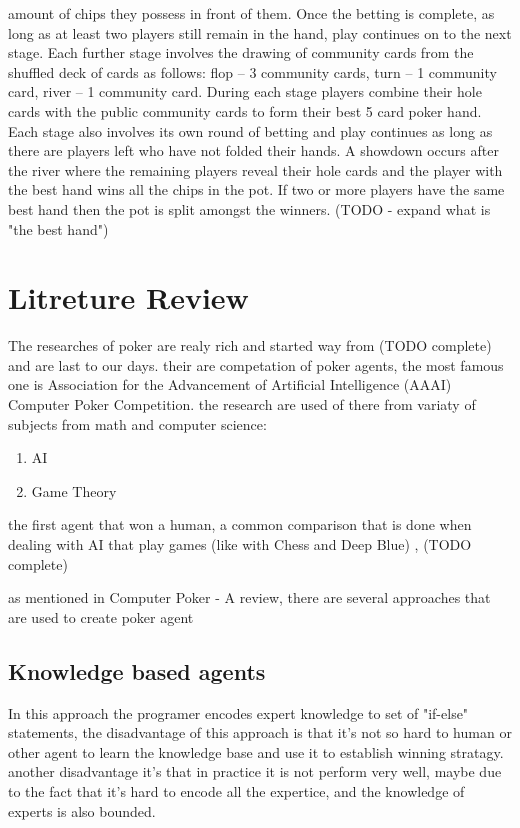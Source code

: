 \documentclass{article}
\begin{document}
amount of chips they possess in front of them. Once the betting is complete, as long as at least two players still remain
in the hand, play continues on to the next stage. Each further stage involves the drawing of community cards from the
shuffled deck of cards as follows: flop – 3 community cards, turn – 1 community card, river – 1 community card.
During each stage players combine their hole cards with the public community cards to form their best 5 card poker
hand. Each stage also involves its own round of betting and play continues as long as there are players left who have not
folded their hands. A showdown occurs after the river where the remaining players reveal their hole cards and the player
with the best hand wins all the chips in the pot. If two or more players have the same best hand then the pot is split
amongst the winners.
(TODO - expand what is "the best hand")
\section{Litreture Review}
The researches of poker are realy rich and started way from (TODO complete) and are last to our days.
their are competation of poker agents, the most famous one is Association for the Advancement of Artificial Intelligence (AAAI) Computer Poker Competition.
the research are used of there from variaty of subjects from math and computer science:
\begin{enumerate}
\item AI
\item Game Theory
\end{enumerate}
the first agent that won a human, a common comparison that is done when dealing with AI that play games (like with Chess and Deep Blue) , (TODO complete)

as mentioned in Computer Poker - A review, there are several approaches that are used to create poker agent\\
\subsection{Knowledge based agents}
In this approach the programer encodes expert knowledge to set of "if-else" statements, the disadvantage of this approach is that it's not so hard to human or other agent to learn the knowledge base and use it to establish winning stratagy. another disadvantage it's that in practice it is not perform very well, maybe due to the fact that it's hard to encode all the expertice, and the knowledge of experts is also bounded.
\end{document}
